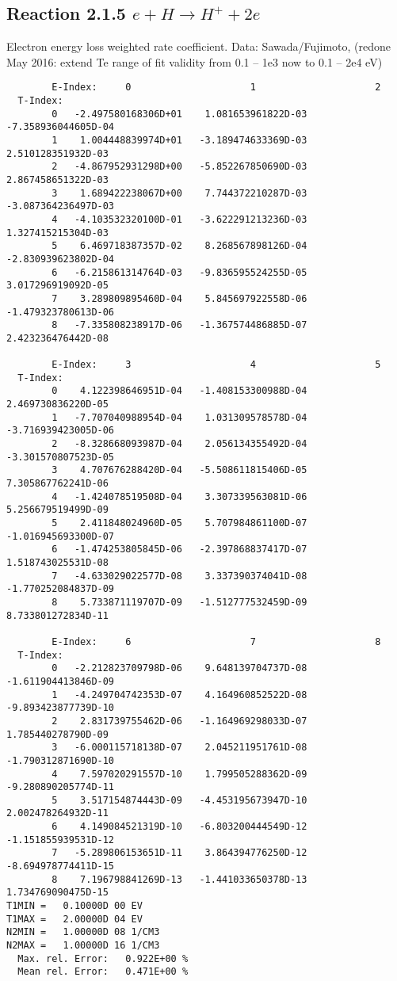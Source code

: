 \documentclass[12pt,dvipdfmx]{article}
\begin{document}
\subsection{
Reaction 2.1.5  $ e + H \rightarrow H^+ + 2e $
}
Electron energy loss weighted rate coefficient. Data: Sawada/Fujimoto, \cite{kn:Sawada}
(redone May 2016: extend Te range of fit validity from 0.1 -- 1e3 now to 0.1 -- 2e4 eV)

\begin{small}\begin{verbatim}
        E-Index:     0                     1                     2
  T-Index:
        0   -2.497580168306D+01    1.081653961822D-03   -7.358936044605D-04
        1    1.004448839974D+01   -3.189474633369D-03    2.510128351932D-03
        2   -4.867952931298D+00   -5.852267850690D-03    2.867458651322D-03
        3    1.689422238067D+00    7.744372210287D-03   -3.087364236497D-03
        4   -4.103532320100D-01   -3.622291213236D-03    1.327415215304D-03
        5    6.469718387357D-02    8.268567898126D-04   -2.830939623802D-04
        6   -6.215861314764D-03   -9.836595524255D-05    3.017296919092D-05
        7    3.289809895460D-04    5.845697922558D-06   -1.479323780613D-06
        8   -7.335808238917D-06   -1.367574486885D-07    2.423236476442D-08

        E-Index:     3                     4                     5
  T-Index:
        0    4.122398646951D-04   -1.408153300988D-04    2.469730836220D-05
        1   -7.707040988954D-04    1.031309578578D-04   -3.716939423005D-06
        2   -8.328668093987D-04    2.056134355492D-04   -3.301570807523D-05
        3    4.707676288420D-04   -5.508611815406D-05    7.305867762241D-06
        4   -1.424078519508D-04    3.307339563081D-06    5.256679519499D-09
        5    2.411848024960D-05    5.707984861100D-07   -1.016945693300D-07
        6   -1.474253805845D-06   -2.397868837417D-07    1.518743025531D-08
        7   -4.633029022577D-08    3.337390374041D-08   -1.770252084837D-09
        8    5.733871119707D-09   -1.512777532459D-09    8.733801272834D-11

        E-Index:     6                     7                     8
  T-Index:
        0   -2.212823709798D-06    9.648139704737D-08   -1.611904413846D-09
        1   -4.249704742353D-07    4.164960852522D-08   -9.893423877739D-10
        2    2.831739755462D-06   -1.164969298033D-07    1.785440278790D-09
        3   -6.000115718138D-07    2.045211951761D-08   -1.790312871690D-10
        4    7.597020291557D-10    1.799505288362D-09   -9.280890205774D-11
        5    3.517154874443D-09   -4.453195673947D-10    2.002478264932D-11
        6    4.149084521319D-10   -6.803200444549D-12   -1.151855939531D-12
        7   -5.289806153651D-11    3.864394776250D-12   -8.694978774411D-15
        8    7.196798841269D-13   -1.441033650378D-13    1.734769090475D-15
T1MIN =   0.10000D 00 EV
T1MAX =   2.00000D 04 EV
N2MIN =   1.00000D 08 1/CM3
N2MAX =   1.00000D 16 1/CM3
  Max. rel. Error:   0.922E+00 %
  Mean rel. Error:   0.471E+00 %


\end{verbatim}\end{small}
\end{document}
